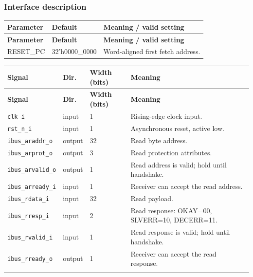 \documentclass[11pt]{article}
\begin{document}
\subsubsection{Interface description}
{\small
\begin{longtable}{@{}L{0.2500\dimexpr\linewidth-24pt\relax}L{0.2300\dimexpr\linewidth-24pt\relax}L{0.5200\dimexpr\linewidth-24pt\relax}@{}}
\toprule
\textbf{Parameter} & \textbf{Default} & \textbf{Meaning / valid setting} \\ \midrule
\endfirsthead
\toprule
\textbf{Parameter} & \textbf{Default} & \textbf{Meaning / valid setting} \\ \midrule
\endhead
RESET\_PC & 32'h0000\_0000 & Word-aligned first fetch address. \\*
\bottomrule\end{longtable}}
{\small
\begin{longtable}{@{}L{0.3400\dimexpr\linewidth-36pt\relax}L{0.1000\dimexpr\linewidth-36pt\relax}L{0.1000\dimexpr\linewidth-36pt\relax}L{0.4600\dimexpr\linewidth-36pt\relax}@{}}
\toprule
\textbf{Signal} & \textbf{Dir.} & \textbf{Width (bits)} & \textbf{Meaning} \\ \midrule
\endfirsthead
\toprule
\textbf{Signal} & \textbf{Dir.} & \textbf{Width (bits)} & \textbf{Meaning} \\ \midrule
\endhead
\texttt{clk\_i} & input & 1 & Rising-edge clock input. \\ \addlinespace[3pt]
\texttt{rst\_n\_i} & input & 1 & Asynchronous reset, active low. \\ \addlinespace[3pt]
\texttt{ibus\_araddr\_o} & output & 32 & Read byte address. \\ \addlinespace[3pt]
\texttt{ibus\_arprot\_o} & output & 3 & Read protection attributes. \\ \addlinespace[3pt]
\texttt{ibus\_arvalid\_o} & output & 1 & Read address is valid; hold until handshake. \\ \addlinespace[3pt]
\texttt{ibus\_arready\_i} & input & 1 & Receiver can accept the read address. \\ \addlinespace[3pt]
\texttt{ibus\_rdata\_i} & input & 32 & Read payload. \\ \addlinespace[3pt]
\texttt{ibus\_rresp\_i} & input & 2 & Read response: OKAY=00, SLVERR=10, DECERR=11. \\ \addlinespace[3pt]
\texttt{ibus\_rvalid\_i} & input & 1 & Read response is valid; hold until handshake. \\ \addlinespace[3pt]
\texttt{ibus\_rready\_o} & output & 1 & Receiver can accept the read response. \\ \addlinespace[3pt]

\end{longtable}}
\end{document}
